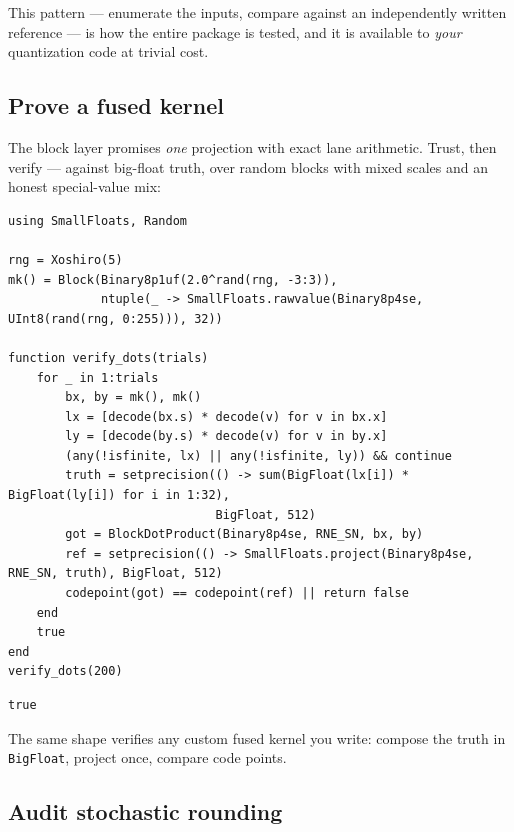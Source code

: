 This pattern — enumerate the inputs, compare against an independently written reference — is how the entire package is tested, and it is available to \emph{your} quantization code at trivial cost.



\subsection{Prove a fused kernel}



\label{10368602136233814758}{}


The block layer promises \emph{one} projection with exact lane arithmetic. Trust, then verify — against big-float truth, over random blocks with mixed scales and an honest special-value mix:




\nopagebreak[4]
\begin{minipage}{\linewidth}
\begin{verbatim}
using SmallFloats, Random

rng = Xoshiro(5)
mk() = Block(Binary8p1uf(2.0^rand(rng, -3:3)),
             ntuple(_ -> SmallFloats.rawvalue(Binary8p4se, UInt8(rand(rng, 0:255))), 32))

function verify_dots(trials)
    for _ in 1:trials
        bx, by = mk(), mk()
        lx = [decode(bx.s) * decode(v) for v in bx.x]
        ly = [decode(by.s) * decode(v) for v in by.x]
        (any(!isfinite, lx) || any(!isfinite, ly)) && continue
        truth = setprecision(() -> sum(BigFloat(lx[i]) * BigFloat(ly[i]) for i in 1:32),
                             BigFloat, 512)
        got = BlockDotProduct(Binary8p4se, RNE_SN, bx, by)
        ref = setprecision(() -> SmallFloats.project(Binary8p4se, RNE_SN, truth), BigFloat, 512)
        codepoint(got) == codepoint(ref) || return false
    end
    true
end
verify_dots(200)
\end{verbatim}




\begin{verbatim}
true
\end{verbatim}
\end{minipage}




The same shape verifies any custom fused kernel you write: compose the truth in \texttt{BigFloat}, project once, compare code points.



\subsection{Audit stochastic rounding}




